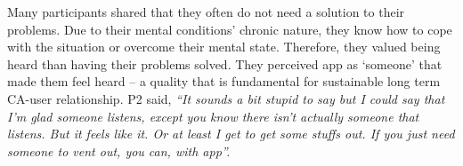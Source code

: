         Many participants shared that they often do not need a solution to their problems. Due to their mental conditions' chronic nature, they know how to cope with the situation or overcome their mental state. Therefore, they valued being heard than having their problems solved. They perceived \acl{app} as `someone' that made them feel heard -- a quality that is fundamental for sustainable long term \ac{CA}-user relationship.
        P2 said, 
                \textit{
                ``It sounds a bit stupid to say but I could say that I'm glad someone listens, except you know there isn't actually someone that listens. But it feels like it. Or at least I get to get some stuffs out. If you just need someone to vent out, you can, with \acl{app}''.}
            
